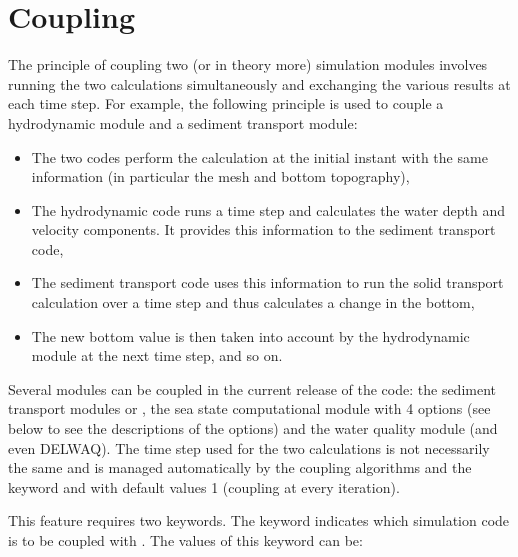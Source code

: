 \section{Coupling}
\label{sec:coupling}

The principle of coupling two (or in theory more) simulation modules involves
running the two calculations simultaneously and exchanging the various results
at each time step.
For example, the following principle is used to couple a hydrodynamic module
and a sediment transport module:

\begin{itemize}
\item The two codes perform the calculation at the initial instant
with the same information (in particular the mesh and bottom topography),

\item The hydrodynamic code runs a time step and calculates the water depth
and velocity components.
It provides this information to the sediment transport code,

\item The sediment transport code uses this information to run the solid
transport calculation over a time step and thus calculates a change in the
bottom,

\item The new bottom value is then taken into account by the hydrodynamic module
at the next time step, and so on.
\end{itemize}

Several modules can be coupled in the current release of the code:
the sediment transport modules \gaia or \sisyphe,
the sea state computational module \tomawac
with 4 options (see below to see the descriptions of the options)
and the water quality module \waqtel (and even DELWAQ).
The time step used for the two calculations is not necessarily the same and is
managed automatically by the coupling algorithms
and the keyword  and
 with default values 1
(coupling at every iteration).

This feature requires two keywords.
The keyword  indicates which simulation code is to be
coupled with .
The values of this keyword can be:

